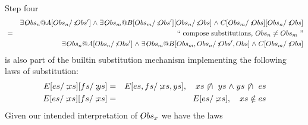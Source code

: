 Step four
\begin{eqnarray*}
  && \exists \qsep Obs_n @ A[Obs_n/\qsep Obs']
     \land \exists \qsep Obs_m @ B[Obs_m/\qsep Obs'][Obs_n/\qsep Obs] \land C[Obs_m/\qsep Obs][Obs_n/\qsep Obs]
\EQ{compose substitutions, $Obs_n \neq Obs_m$}
\\&& \exists \qsep Obs_n @ A[Obs_n/\qsep Obs']
     \land \exists \qsep Obs_m @ B[Obs_m,Obs_n/\qsep Obs',Obs] \land C[Obs_m/\qsep Obs]
\end{eqnarray*}
is also part of the builtin substitution mechanism
implementing the following laws of substitution:
\begin{eqnarray*}
  E[es/\qsep xs][fs/\qsep ys] &=& E[es,fs/\qsep xs,ys], \quad xs \DISJ ys \land ys \DISJ es
\\ E[es/\qsep xs][fs/\qsep xs] &=& E[es/\qsep xs], \quad xs \notin es
\end{eqnarray*}
Given our intended interpretation of $\mathbin{;\!\!} Obs_x$ we have the laws


